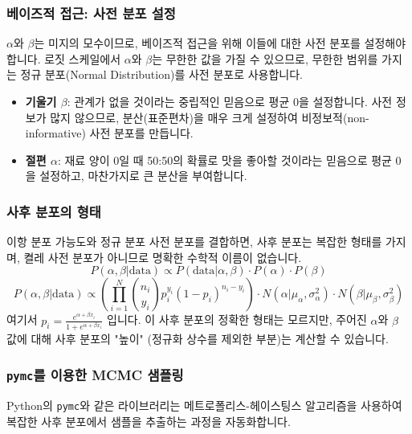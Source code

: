\documentclass[11pt,a4paper]{book}
\theoremstyle{definition}
\begin{document}
\subsubsection*{베이즈적 접근: 사전 분포 설정}
$\alpha$와 $\beta$는 미지의 모수이므로, 베이즈적 접근을 위해 이들에 대한 사전 분포를 설정해야 합니다. 로짓 스케일에서 $\alpha$와 $\beta$는 무한한 값을 가질 수 있으므로, 무한한 범위를 가지는 정규 분포(Normal Distribution)를 사전 분포로 사용합니다.

\begin{infobox}[title=사전 분포 설정 예시]
\begin{itemize}
    \item \textbf{기울기 $\beta$}: 관계가 없을 것이라는 중립적인 믿음으로 평균 0을 설정합니다. 사전 정보가 많지 않으므로, 분산(표준편차)을 매우 크게 설정하여 비정보적(non-informative) 사전 분포를 만듭니다.
    \item \textbf{절편 $\alpha$}: 재료 양이 0일 때 50:50의 확률로 맛을 좋아할 것이라는 믿음으로 평균 0을 설정하고, 마찬가지로 큰 분산을 부여합니다.
\end{itemize}
\end{infobox}

\subsubsection*{사후 분포의 형태}
이항 분포 가능도와 정규 분포 사전 분포를 결합하면, 사후 분포는 복잡한 형태를 가지며, 켤레 사전 분포가 아니므로 명확한 수학적 이름이 없습니다.
\[ P(\alpha, \beta | \text{data}) \propto P(\text{data} | \alpha, \beta) \cdot P(\alpha) \cdot P(\beta) \]
\[ P(\alpha, \beta | \text{data}) \propto \left( \prod_{i=1}^{N} \binom{n_i}{y_i} p_i^{y_i} (1-p_i)^{n_i-y_i} \right) \cdot N(\alpha | \mu_\alpha, \sigma_\alpha^2) \cdot N(\beta | \mu_\beta, \sigma_\beta^2) \]
여기서 $p_i = \frac{e^{\alpha + \beta x_i}}{1 + e^{\alpha + \beta x_i}}$ 입니다.
이 사후 분포의 정확한 형태는 모르지만, 주어진 $\alpha$와 $\beta$ 값에 대해 사후 분포의 "높이" (정규화 상수를 제외한 부분)는 계산할 수 있습니다.

\subsubsection*{\texttt{pymc}를 이용한 MCMC 샘플링}
Python의 \texttt{pymc}와 같은 라이브러리는 메트로폴리스-헤이스팅스 알고리즘을 사용하여 복잡한 사후 분포에서 샘플을 추출하는 과정을 자동화합니다.
\end{document}
